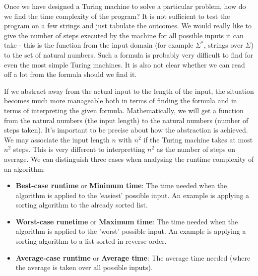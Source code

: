 \documentclass[11pt]{article}
\begin{document}
	\par 
	Once we have designed a Turing machine to solve a particular problem, how do we find the time complexity of the program? It is not sufficient to test the program on a few strings and just tabulate the outcomes. We would really like to give the number of steps executed by the machine for all possible inputs it can take - this is the function from the input domain (for example $\Sigma^{*}$, strings over $\Sigma$) to the set of natural numbers. Such a formula is probably very difficult to find for even the most simple Turing machines. It is also not clear whether we can read off a lot from the formula should we find it.
	
	\par If we abstract away from the actual input to the length of the input, the situation becomes much more manageable both in terms of finding the formula and in terms of interpreting the given formula. Mathematically, we will get a function from the natural numbers (the input length) to the natural numbers (number of steps taken). It's important to be precise about how the abstraction is achieved. We may associate the input length $n$ with $n^{2}$ if the Turing machine takes at most $n^{2}$ steps. This is very different to interpretting $n^{2}$ as the number of steps on average. We can distinguish three cases when analysing the runtime complexity of an algorithm:
	\begin{itemize}
		\item \textbf{Best-case runtime} or \textbf{Minimum time}: The time needed when the algorithm is applied to the 'easiest' possible input. An example is applying a sorting algorithm to the already sorted list.
		\item \textbf{Worst-case runetime} or \textbf{Maximum time}: The time needed when the algorithm is applied to the 'worst' possible input. An example is applying a sorting algorithm to a list sorted in reverse order.
		\item \textbf{Average-case runtime} or \textbf{Average time}: The average time needed (where the average is taken over all possible inputs).
	\end{itemize}
	
\end{document}
